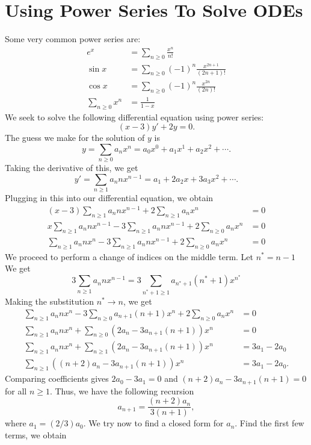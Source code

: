 \section{Using Power Series To Solve ODEs}
Some very common power series are:
\begin{align*}
    e^x &= \sum_{n \geq 0} \frac{x^n}{n!} \\
    \sin x &= \sum_{n \geq 0} (-1)^n \frac{x^{2n+1}}{(2n+1)!} \\
    \cos x &= \sum_{n \geq 0} (-1)^n \frac{x^{2n}}{(2n)!} \\
    \sum_{n \geq 0} x^n &= \frac{1}{1-x}
\end{align*}
We seek to solve the following differential equation using power series:
$$(x-3)y' + 2y = 0.$$
The guess we make for the solution of $y$ is
$$y = \sum_{n \geq 0} a_n x^n = a_0 x^0 + a_1 x^1 + a_2 x^2 +\cdots.$$
Taking the derivative of this, we get
$$y' = \sum_{n \geq 1} a_n n x^{n-1} = a_1+2a_2x + 3a_3x^2 + \cdots.$$
Plugging in this into our differential equation, we obtain
\begin{align*}
    (x-3)\sum_{n \geq 1} a_n n x^{n-1} + 2\sum_{n \geq 1} a_n x^n &= 0 \\
    x\sum_{n \geq 1} a_n n x^{n-1} - 3\sum_{n \geq 1} a_n n x^{n-1}+2\sum_{n \geq 0} a_n x^n &= 0 \\
    \sum_{n \geq 1} a_n n x^{n} - 3\sum_{n \geq 1} a_n n x^{n-1}+2\sum_{n \geq 0} a_n x^n & =0
\end{align*}
We proceed to perform a change of indices on the middle term. Let $n^{*}=n-1$
We get 
$$3\sum_{n \geq 1} a_n n x^{n-1} = 3\sum_{n^*+1 \geq 1} a_{n^*+1} (n^* +1)x^{n^*}$$
Making the substitution $n^* \rightarrow n$, we get
\begin{align*}
    \sum_{n \geq 1} a_n n x^{n} - 3\sum_{n \geq 0} a_{n+1} (n+1)x^{n}+2\sum_{n \geq 0} a_n x^n &= 0\\
    \sum_{n \geq 1} a_n n x^{n} + \sum_{n \geq 0} \left(2a_n-3a_{n+1}(n+1)\right)x^n &= 0 \\
    \sum_{n \geq 1} a_n n x^{n} + \sum_{n \geq 1} \left(2a_n-3a_{n+1}(n+1)\right)x^n &= 3a_1-2a_0 \\
    \sum_{n \geq 1}\left((n+2)a_n-3a_{n+1}(n+1)\right)x^n &= 3a_1 - 2a_0.
\end{align*}
Comparing coefficients gives $2a_0-3a_1 = 0$ and $(n+2)a_n-3a_{n+1}(n+1) = 0$ for all
$n \geq 1$. Thus, we have the following recursion $$a_{n+1} = \frac{(n+2)a_n}{3(n+1)},$$
where $a_1 = (2/3)a_0$. We try now to find a closed form for $a_n$. Find the first few
terms, we obtain
